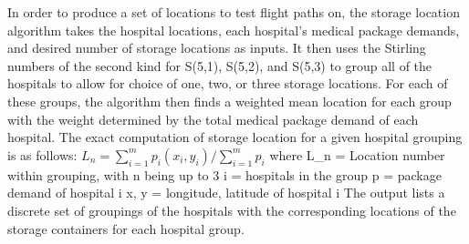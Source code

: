 	In order to produce a set of locations to test flight paths on, the storage location algorithm takes the hospital locations, each hospital's medical package demands, and desired number of storage locations as inputs. It then uses the Stirling numbers of the second kind for S(5,1), S(5,2), and S(5,3) to group all of the hospitals to allow for choice of one, two, or three storage locations. For each of these groups, the algorithm then finds a weighted mean location for each group with the weight determined by the total medical package demand of each hospital.  The exact computation of storage location for a given hospital grouping is as follows:
	$ L_n = \sum_{i=1}^{m} p_i(x_i, y_i) / \sum_{i=1}^{m} p_i $
	where L_n = Location number within grouping, with n being up to 3
		i = hospitals in the group
		p = package demand of hospital i
		x, y = longitude, latitude of hospital i
The output lists a discrete set of groupings of the hospitals with the corresponding locations of the storage containers for each hospital group.	